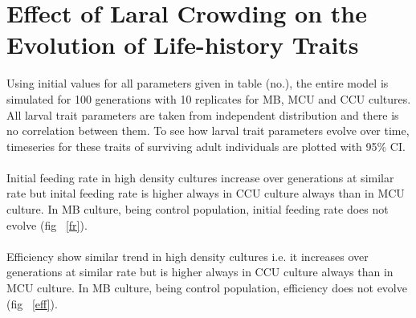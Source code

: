 \section{Effect of Laral Crowding on the Evolution of Life-history Traits}
Using initial values for all parameters given in table (no.), the entire model is simulated for 100 generations with 10 replicates for MB, MCU and CCU cultures. All larval trait parameters are taken from independent distribution and there is no correlation between them. To see how larval trait parameters evolve over time, timeseries for these traits of surviving adult individuals are plotted with 95$\%$ CI. \\\\
Initial feeding rate in high density cultures increase over generations at similar rate but inital feeding rate is higher always in CCU culture always than in MCU culture. In MB culture, being control population, initial feeding rate does not evolve (fig ~\ref{fr}).\\\\
Efficiency show similar trend in high density cultures i.e. it increases over generations at similar rate but is higher always in CCU culture always than in MCU culture. In MB culture, being control population, efficiency does not evolve (fig ~\ref{eff}).
\newpage
